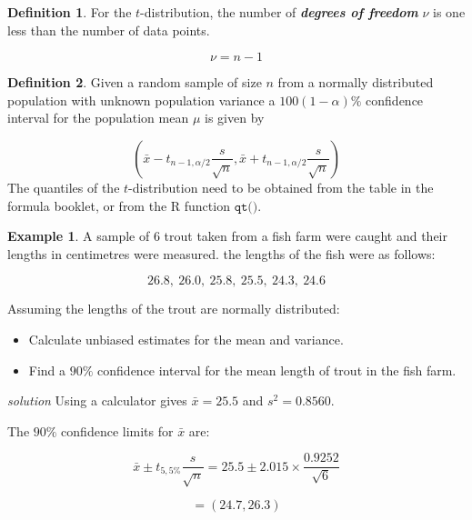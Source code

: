 \documentclass[
]{book}
\theoremstyle{definition}
\newtheorem{definition}{Definition}[chapter]
\theoremstyle{definition}
\newtheorem{example}{Example}[chapter]
\theoremstyle{definition}
\theoremstyle{definition}
\theoremstyle{remark}
\begin{document}
\begin{definition}
For the \(t\)-distribution, the number of \textbf{\emph{degrees of freedom}} \(\nu\) is one less than the number of data points.

\[\nu = n-1\]
\end{definition}

\begin{definition}
Given a random sample of size \(n\) from a normally distributed population with unknown population variance a \(100(1-\alpha)\%\) confidence interval for the population mean \(\mu\) is given by

\[\left( \bar{x} - t_{n-1,\alpha /2} \frac{s}{\sqrt{n}}, \bar{x} + t_{n-1,\alpha /2} \frac{s}{\sqrt{n}}\right)\]
The quantiles of the \(t\)-distribution need to be obtained from the table in the formula booklet, or from the R function \(\texttt{qt()}\).
\end{definition}

\begin{example}

A sample of \(6\) trout taken from a fish farm were caught and their lengths in centimetres were measured. the lengths of the fish were as follows:

\[ 26.8, \ 26.0, \ 25.8, \ 25.5, \ 24.3, \ 24.6 \]

Assuming the lengths of the trout are normally distributed:

\begin{itemize}
\item
  Calculate unbiased estimates for the mean and variance.
\item
  Find a \(90\%\) confidence interval for the mean length of trout in the fish farm.
\end{itemize}

\end{example}

\emph{solution}
Using a calculator gives \(\bar{x}=25.5\) and \(s^2 = 0.8560\).

The \(90\%\) confidence limits for \(\bar{x}\) are:

\[\bar{x} \pm t_{5,5\%}\frac{s}{\sqrt{n}} = 25.5 \pm 2.015\times \frac{0.9252}{\sqrt{6}}\]

\[=(24.7,26.3)\]
\end{document}
